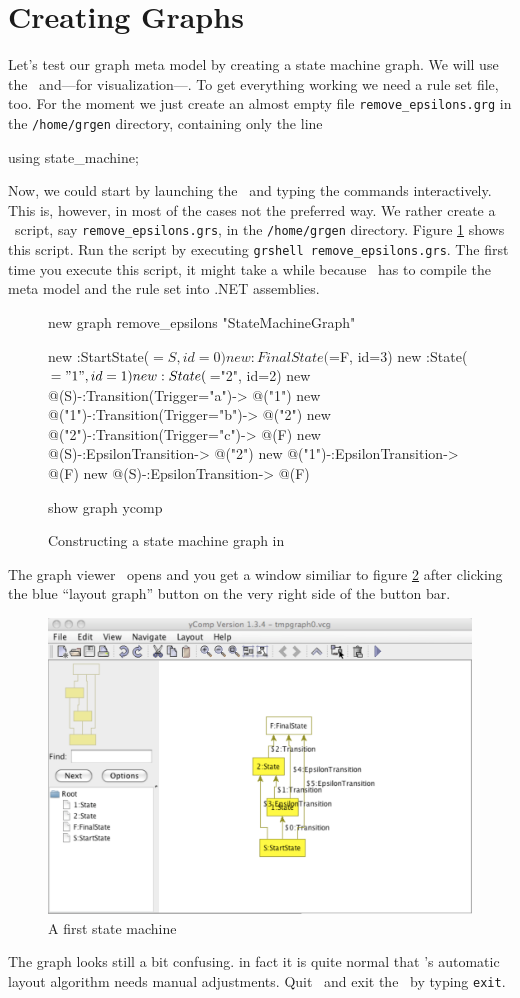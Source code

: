 \section{Creating Graphs}
\label{sct:quick:create}
Let's test our graph meta model by creating a state machine graph.
We will use the \GrShell\ and---for visualization---\yComp.
To get everything working we need a rule set file, too.
For the moment we just create an almost empty file \texttt{remove\_epsilons.grg} in the \texttt{/home/grgen} directory, containing only the line
\begin{grgen}
using state_machine;
\end{grgen}
Now, we could start by launching the \GrShell\ and typing the commands interactively.
This is, however, in most of the cases not the preferred way.
We rather create a \GrShell\ script, say \texttt{remove\_epsilons.grs}, in the \texttt{/home/grgen} directory.
Figure \ref{fig:quick:shell} shows this script.
Run the script by executing \texttt{grshell remove\_epsilons.grs}.
The first time you execute this script, it might take a while because \GrG\ has to compile the meta model and the rule set into .NET assemblies.
\begin{figure}[htbp]
    \centering
    \begin{grgen}
new graph remove_epsilons "StateMachineGraph"

new :StartState($=S, id=0)
new :FinalState($=F, id=3)
new :State($="1", id=1)
new :State($="2", id=2)
new @(S)-:Transition(Trigger="a")-> @("1")
new @("1")-:Transition(Trigger="b")-> @("2")
new @("2")-:Transition(Trigger="c")-> @(F)
new @(S)-:EpsilonTransition-> @("2")
new @("1")-:EpsilonTransition-> @(F)
new @(S)-:EpsilonTransition-> @(F)

show graph ycomp
    \end{grgen}
    \caption{Constructing a state machine graph in \GrShell}
    \label{fig:quick:shell}
\end{figure}
The graph viewer \yComp\ opens and you get a window similiar to figure \ref{fig:quick:ycomp} after clicking the blue ``layout graph'' button on the very right side of the button bar.
\begin{figure}[htbp]
	\centering
	\includegraphics[width=0.8\linewidth]{fig/quickycomp}
	\caption{A first state machine}
	\label{fig:quick:ycomp}
\end{figure}
The graph looks still a bit confusing.
in fact it is quite normal that \yComp's automatic layout algorithm needs manual adjustments.
Quit \yComp\ and exit the \GrShell\ by typing \texttt{exit}.

